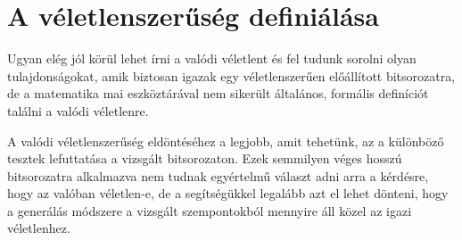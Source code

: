 \documentclass[12pt,a4paper,oneside]{article}
\begin{document}
\section*{A véletlenszerűség definiálása}
Ugyan elég jól körül lehet írni a valódi véletlent és fel tudunk sorolni olyan tulajdonságokat, amik biztosan igazak egy véletlenszerűen előállított bitsorozatra, de a matematika mai eszköztárával nem sikerült általános, formális definíciót találni a valódi véletlenre.
\par
A valódi véletlenszerűség eldöntéséhez a legjobb, amit tehetünk, az a különböző tesztek lefuttatása a vizsgált bitsorozaton. Ezek semmilyen véges hosszú bitsorozatra alkalmazva nem tudnak egyértelmű választ adni arra a kérdésre, hogy az valóban véletlen-e, de a segítségükkel legalább azt el lehet dönteni, hogy a generálás módszere a vizsgált szempontokból mennyire áll közel az igazi véletlenhez.
\end{document}
